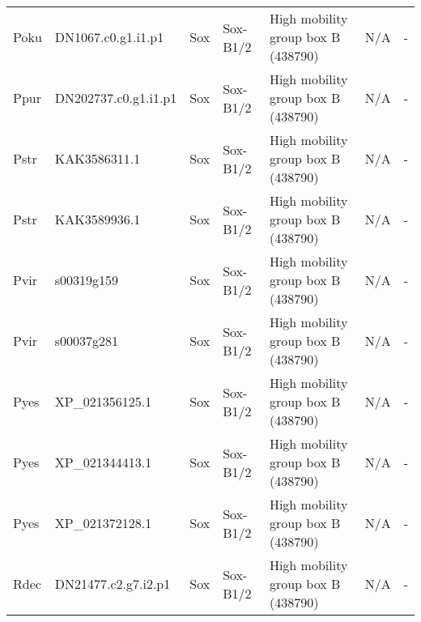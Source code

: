 \documentclass[../main.tex]{subfiles}
\begin{document}
\begin{landscape}
\begin{longtable}{lllllll}
		Poku           & DN1067.c0.g1.i1.p1    & Sox            & Sox-B1/2            & High mobility group box B (438790)          & N/A                                                                    & -                    \\
		Ppur           & DN202737.c0.g1.i1.p1  & Sox            & Sox-B1/2            & High mobility group box B (438790)          & N/A                                                                    & -                    \\
		Pstr           & KAK3586311.1          & Sox            & Sox-B1/2            & High mobility group box B (438790)          & N/A                                                                    & -                    \\
		Pstr           & KAK3589936.1          & Sox            & Sox-B1/2            & High mobility group box B (438790)          & N/A                                                                    & -                    \\
		Pvir           & s00319g159            & Sox            & Sox-B1/2            & High mobility group box B (438790)          & N/A                                                                    & -                    \\
		Pvir           & s00037g281            & Sox            & Sox-B1/2            & High mobility group box B (438790)          & N/A                                                                    & -                    \\
		Pyes           & XP\_021356125.1       & Sox            & Sox-B1/2            & High mobility group box B (438790)          & N/A                                                                    & -                    \\
		Pyes           & XP\_021344413.1       & Sox            & Sox-B1/2            & High mobility group box B (438790)          & N/A                                                                    & -                    \\
		Pyes           & XP\_021372128.1       & Sox            & Sox-B1/2            & High mobility group box B (438790)          & N/A                                                                    & -                    \\
		Rdec           & DN21477.c2.g7.i2.p1   & Sox            & Sox-B1/2            & High mobility group box B (438790)          & N/A                                                                    & -                    \\

\end{longtable}
\end{landscape}
\end{document}
